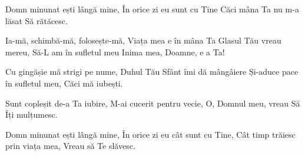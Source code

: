 
\beginverse
Domn minunat ești lângă mine,
În orice zi eu sunt cu Tine
Căci mâna Ta nu m-a lăsat
Să rătăcesc.
\endverse

\beginchorus
Ia-mă, schimbă-mă, folosește-mă,
Viața mea e în mâna Ta
Glasul Tău vreau mereu,
Să-L am în sufletul meu
Inima mea, Doamne, e a Ta!
\endchorus

\beginverse
Cu gingășie mă strigi pe nume,
Duhul Tău Sfânt îmi dă mângâiere
Și-aduce pace în sufletul meu,
Căci mă iubești.
\endverse

\beginverse
Sunt copleșit de-a Ta iubire,
M-ai cucerit pentru vecie,
O, Domnul meu, vreau
Să Îți mulțumesc.
\endverse

\beginverse
Domn minunat ești lângă mine,
În orice zi eu cât sunt cu Tine,
Cât timp trăiesc prin viața mea,
Vreau să Te slăvesc.
\endverse

\endsong


